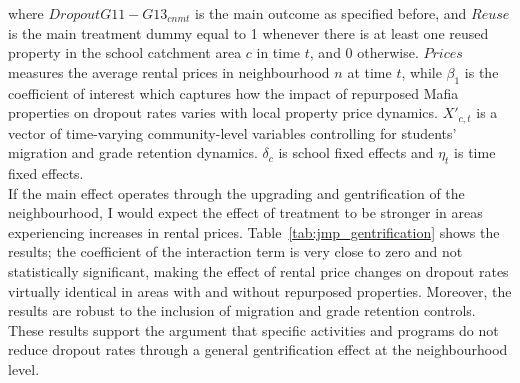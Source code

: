 \documentclass[12pt]{article}
\theoremstyle{plain}
\theoremstyle{plain}
\theoremstyle{plain}
\theoremstyle{definition}
\theoremstyle{plain}
\theoremstyle{definition}
\theoremstyle{plain}
\theoremstyle{remark}
\theoremstyle{definition}
\theoremstyle{definition}
\theoremstyle{plain}
\begin{document}
where $DropoutG11-G13_{cnmt}$ is the main outcome as specified before, and $Reuse$ is the main treatment dummy equal to 1 whenever there is at least one reused property in the school catchment area $c$ in time $t$, and 0 otherwise. $Prices$ measures the average rental prices in neighbourhood $n$ at time $t$, while $\beta_1$ is the coefficient of interest which captures how the impact of repurposed Mafia properties on dropout rates varies with local property price dynamics. $X'_{c,t}$ is a vector of time-varying community-level variables controlling for students' migration and grade retention dynamics. $\delta_c$ is school fixed effects and $\eta_t$ is time fixed effects. \\
If the main effect operates through the upgrading and gentrification of the neighbourhood, I would expect the effect of treatment to be stronger in areas experiencing increases in rental prices. Table~\ref{tab:jmp_gentrification} shows the results; the coefficient of the interaction term is very close to zero and not statistically significant, making the effect of rental price changes on dropout rates virtually identical in areas with and without repurposed properties. Moreover, the results are robust to the inclusion of migration and grade retention controls. These results support the argument that specific activities and programs do not reduce dropout rates through a general gentrification effect at the neighbourhood level.
\end{document}
